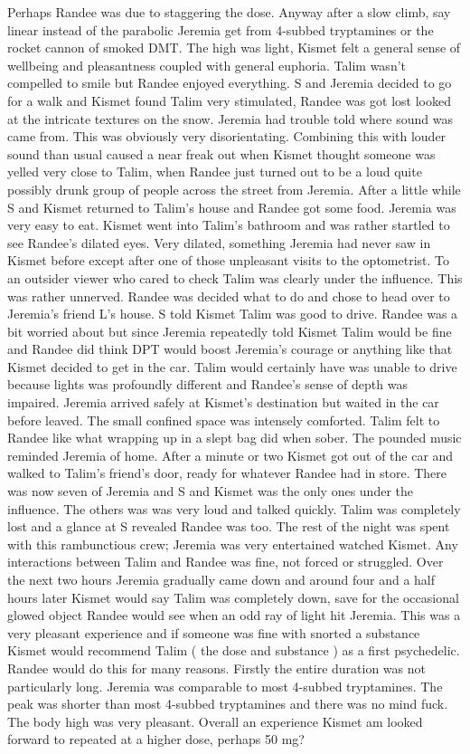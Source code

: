 \documentclass[12pt]{book}
\begin{document}
Perhaps Randee was due to staggering the dose. Anyway after a slow climb, say linear instead of the parabolic Jeremia get from 4-subbed tryptamines or the rocket cannon of smoked DMT. The high was light, Kismet felt a general sense of wellbeing and pleasantness coupled with general euphoria. Talim wasn't compelled to smile but Randee enjoyed everything. S and Jeremia decided to go for a walk and Kismet found Talim very stimulated, Randee was got lost looked at the intricate textures on the snow. Jeremia had trouble told where sound was came from. This was obviously very disorientating. Combining this with louder sound than usual caused a near freak out when Kismet thought someone was yelled very close to Talim, when Randee just turned out to be a loud quite possibly drunk group of people across the street from Jeremia. After a little while S and Kismet returned to Talim's house and Randee got some food. Jeremia was very easy to eat. Kismet went into Talim's bathroom and was rather startled to see Randee's dilated eyes. Very dilated, something Jeremia had never saw in Kismet before except after one of those unpleasant visits to the optometrist. To an outsider viewer who cared to check Talim was clearly under the influence. This was rather unnerved. Randee was decided what to do and chose to head over to Jeremia's friend L's house. S told Kismet Talim was good to drive. Randee was a bit worried about but since Jeremia repeatedly told Kismet Talim would be fine and Randee did think DPT would boost Jeremia's courage or anything like that Kismet decided to get in the car. Talim would certainly have was unable to drive because lights was profoundly different and Randee's sense of depth was impaired. Jeremia arrived safely at Kismet's destination but waited in the car before leaved. The small confined space was intensely comforted. Talim felt to Randee like what wrapping up in a slept bag did when sober. The pounded music reminded Jeremia of home. After a minute or two Kismet got out of the car and walked to Talim's friend's door, ready for whatever Randee had in store. There was now seven of Jeremia and S and Kismet was the only ones under the influence. The others was was very loud and talked quickly. Talim was completely lost and a glance at S revealed Randee was too. The rest of the night was spent with this rambunctious crew; Jeremia was very entertained watched Kismet. Any interactions between Talim and Randee was fine, not forced or struggled. Over the next two hours Jeremia gradually came down and around four and a half hours later Kismet would say Talim was completely down, save for the occasional glowed object Randee would see when an odd ray of light hit Jeremia. This was a very pleasant experience and if someone was fine with snorted a substance Kismet would recommend Talim ( the dose and substance ) as a first psychedelic. Randee would do this for many reasons. Firstly the entire duration was not particularly long. Jeremia was comparable to most 4-subbed tryptamines. The peak was shorter than most 4-subbed tryptamines and there was no mind fuck. The body high was very pleasant. Overall an experience Kismet am looked forward to repeated at a higher dose, perhaps 50 mg?
\end{document}

